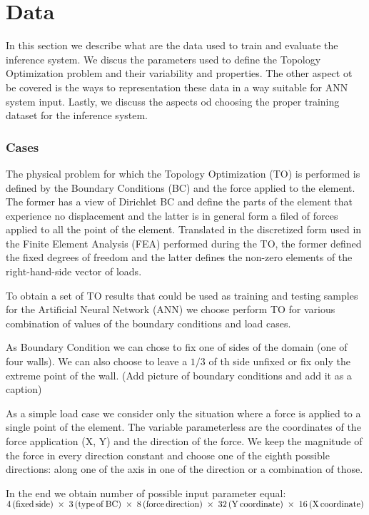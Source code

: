 
\chapter{Data}

In this section we describe what are the data used to train and evaluate the inference system.
We discus the parameters used to define the Topology Optimization problem and their variability and properties.
The other aspect ot be covered is the ways to representation these data in a way suitable for ANN system input.
Lastly, we discuss the aspects od choosing the proper training dataset for the inference system.

\subsection{Cases}

The physical problem for which the Topology Optimization (TO) is performed is defined by the Boundary Conditions (BC) and the force applied to the element. 
The former has a view of Dirichlet BC and define the parts of the element that experience no displacement and the latter is in general form a filed of forces applied to all the point of the element. 
Translated in the discretized form used in the Finite Element Analysis (FEA) performed during the TO, the former defined the fixed degrees of freedom and the latter defines the non-zero elements of the right-hand-side vector of loads.

To obtain a set of TO results that could be used as training and testing samples for the Artificial Neural Network (ANN) we choose perform TO for various combination of values of the boundary conditions and load cases.

As Boundary Condition we can chose to fix one of sides of the domain (one of four walls). 
We can also choose to leave a ${1/3}$ of th side unfixed or fix only the extreme point of the wall. (Add picture of boundary conditions and add it as a caption)

As a simple load case we consider only the situation where a force is applied to a single point of the element. 
The variable parameterless are the coordinates of the force application (X, Y) and the direction of the force.
We keep the magnitude of the force in every direction constant and choose one of the eighth possible directions: along one of the axis in one of the direction or a combination of those.

In the end we obtain number of possible input parameter equal: $4\,\mathrm{(fixed \, side)} \; \times \; 3\,\mathrm{(type \, of \, BC)} \\ \; \times \; 8\,\mathrm{(force \, direction)} \; \times \; 32\,\mathrm{(Y \, coordinate)} \; \times \; 16\,\mathrm{(X \, coordinate)}$


